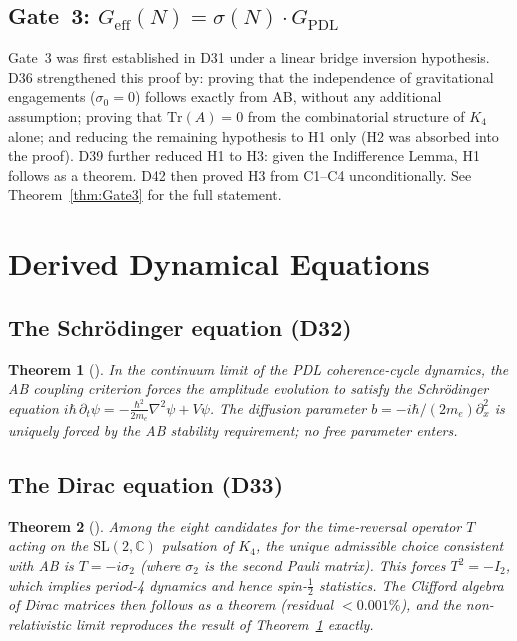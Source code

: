 \documentclass[11pt,a4paper]{article}
\theoremstyle{plain}
\newtheorem{theorem}{Theorem}[section]
\theoremstyle{definition}
\theoremstyle{remark}
\newcommand{\Geff}{G_{\mathrm{eff}}}
\newcommand{\GPDL}{G_{\mathrm{PDL}}}
\newcommand{\sigmaN}{\sigma(N)}
\begin{document}
\subsection{Gate~3: \texorpdfstring{$\Geff(N)=\sigmaN\cdot\GPDL$}{Geff(N)=sigmaN·GPDL}}
\label{subsec:gate3}
Gate~3 was first established in D31 under a linear bridge inversion hypothesis. D36 strengthened this proof by: proving that the independence of gravitational engagements ($\sigma_0=0$) follows exactly from AB, without any additional assumption; proving that $\mathrm{Tr}(A)=0$ from the combinatorial structure of $K_4$ alone; and reducing the remaining hypothesis to H1 only (H2 was absorbed into the proof). D39 further reduced H1 to H3: given the Indifference Lemma, H1 follows as a theorem. D42 then proved H3 from C1--C4 unconditionally. See Theorem~\ref{thm:Gate3} for the full statement.

\section{Derived Dynamical Equations}
\label{sec:dynamics}

\subsection{The Schr\"odinger equation (D32)}
\label{subsec:schrodinger}
\begin{theorem}[\cite{D32}]
\label{thm:Schrodinger}
In the continuum limit of the PDL coherence-cycle dynamics, the AB coupling criterion forces the amplitude evolution to satisfy the Schr\"odinger equation $i\hbar\,\partial_t\psi=-\frac{\hbar^2}{2m_e}\nabla^2\psi+V\psi$. The diffusion parameter $b=-i\hbar/(2m_e)\partial_x^2$ is uniquely forced by the AB stability requirement; no free parameter enters.
\end{theorem}

\subsection{The Dirac equation (D33)}
\label{subsec:dirac}
\begin{theorem}[\cite{D33}]
\label{thm:Dirac}
Among the eight candidates for the time-reversal operator $T$ acting on the $\mathrm{SL}(2,\mathbb{C})$ pulsation of $K_4$, the unique admissible choice consistent with AB is $T=-i\sigma_2$ (where $\sigma_2$ is the second Pauli matrix). This forces $T^2=-I_2$, which implies period-4 dynamics and hence spin-$\tfrac{1}{2}$ statistics. The Clifford algebra of Dirac matrices then follows as a theorem (residual $<0.001\%$), and the non-relativistic limit reproduces the result of Theorem~\ref{thm:Schrodinger} exactly.
\end{theorem}
\end{document}
